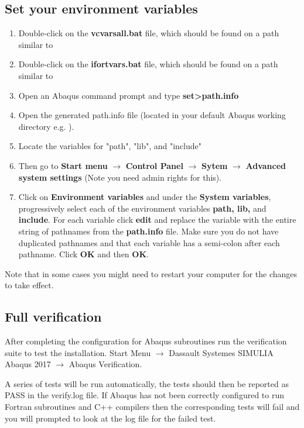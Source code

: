 \documentclass[10pt,a4paper,oneside]{article}
\begin{document}
\subsection{Set your environment variables}
\begin{enumerate}
\item Double-click on the \textbf{vcvarsall.bat} file, which should be found on a path similar to\\
\item Double-click on the \textbf{ifortvars.bat} file, which should be found on a path similar to\\
\item Open an Abaqus command prompt and type \textbf{set>path.info}
\item Open the generated path.info file (located in your default Abaqus working directory e.g. ).
\item Locate the variables for "path", "lib", and "include"
\item Then go to \textbf{Start menu} $\rightarrow$ \textbf{Control Panel} $\rightarrow$ \textbf{Sytem} $\rightarrow$ \textbf{Advanced system settings} (Note you need admin rights for this).
\item Click on \textbf{Environment variables} and under the \textbf{System variables}, progressively select each of the environment variables \textbf{path, lib,} and \textbf{ include}. For each variable click \textbf{edit} and replace the variable with the entire string of pathnames from the \textbf{path.info} file. Make sure you do not have duplicated pathnames and that each variable has a semi-colon after each pathname. Click \textbf{OK} and then \textbf{OK}.
\end{enumerate}

Note that in some cases you might need to restart your computer for the changes to take effect.

\subsection{Full verification}
After completing the configuration for Abaqus subroutines run the verification suite to test the installation. 
Start Menu $\rightarrow$ Dassault Systemes SIMULIA Abaqus 2017 $\rightarrow$ Abaqus Verification.

A series of tests will be run automatically, the tests should then be reported as PASS in the verify.log file. If Abaqus has not been correctly configured to run Fortran subroutines and C++ compilers then the corresponding tests will fail and you will prompted to look at the log file for the failed test.
 
\end{document}
